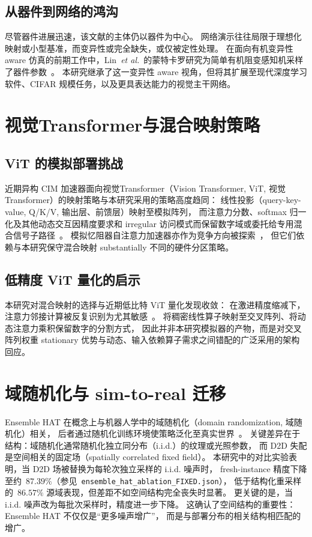 \subsection{从器件到网络的鸿沟}

尽管器件进展迅速，该文献的主体仍以器件为中心。
网络演示往往局限于理想化映射或小型基准，而变异性或完全缺失，或仅被定性处理。
在面向有机变异性 aware 仿真的前期工作中，Lin~\emph{et al.}~的蒙特卡罗研究为简单有机阻变感知机采样了器件参数~\citep{lin2016physical}。
本研究继承了这一变异性 aware 视角，但将其扩展至现代深度学习软件、CIFAR 规模任务，以及更具表达能力的视觉主干网络。

\section{视觉Transformer与混合映射策略}

\subsection{ViT 的模拟部署挑战}

近期异构 CIM 加速器面向视觉Transformer（Vision Transformer, ViT, 视觉Transformer）的映射策略与本研究采用的策略高度趋同：
线性投影（query-key-value, Q/K/V, 输出层、前馈层）映射至模拟阵列，
而注意力分数、softmax 归一化及其他动态交互因精度要求和 irregular 访问模式而保留数字域或委托给专用混合信号子路径~\citep{kim2025hemlet,lin2024hardsea}。
模拟忆阻器自注意力加速器亦作为竞争方向被探索~\citep{bettayeb2024memristorattention,qiu2025m3dattention,mia2026trilinear}，
但它们依赖与本研究保守混合映射 substantially 不同的硬件分区策略。

\subsection{低精度 ViT 量化的启示}

本研究对混合映射的选择与近期低比特 ViT 量化发现收敛：
在激进精度缩减下，注意力邻接计算被反复识别为尤其敏感~\citep{liu2021ptqvit,li2022qvit,lin2023vitptq}。
将稠密线性算子映射至交叉阵列、将动态注意力乘积保留数字的分割方式，
因此并非本研究模拟器的产物，而是对交叉阵列权重 stationary 优势与动态、输入依赖算子需求之间错配的广泛采用的架构回应。

\section{域随机化与 sim-to-real 迁移}

Ensemble HAT 在概念上与机器人学中的域随机化（domain randomization, 域随机化）相关，
后者通过随机化训练环境使策略泛化至真实世界~\citep{tobin2017domain}。
关键差异在于结构：域随机化通常随机化独立同分布（i.i.d.）的纹理或光照参数，
而 D2D 失配是空间相关的固定场（spatially correlated fixed field）。
本研究中的对比实验表明，当 D2D 场被替换为每轮次独立采样的 i.i.d. 噪声时，
fresh-instance 精度下降至约~$87.39\%$（参见~\texttt{ensemble\_hat\_ablation\_FIXED.json}），
低于结构化重采样的~$86.57\%$ 源域表现，但差距不如空间结构完全丧失时显著。
更关键的是，当 i.i.d. 噪声改为每批次采样时，精度进一步下降。
这确认了空间结构的重要性：Ensemble HAT 不仅仅是``更多噪声增广''，
而是与部署分布的相关结构相匹配的增广。

